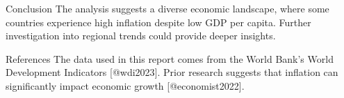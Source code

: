 \documentclass[
  letterpaper,
  DIV=11,
  numbers=noendperiod]{scrartcl}
\begin{document}
Conclusion The analysis suggests a diverse economic landscape, where
some countries experience high inflation despite low GDP per capita.
Further investigation into regional trends could provide deeper
insights.

References The data used in this report comes from the World Bank's
World Development Indicators {[}@wdi2023{]}. Prior research suggests
that inflation can significantly impact economic growth
{[}@economist2022{]}.
\end{document}
